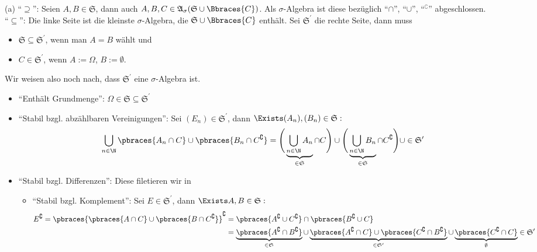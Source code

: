 \begin{solution}

(a) \enquote{$\supseteq$}: Seien $A, B \in \mathfrak{S}$, dann auch $A, B, C \in \mathfrak{A}_\sigma(\mathfrak{S} \cup \Bbraces{C})$. Als $\sigma$-Algebra ist diese bezüglich \enquote{$\cap$}, \enquote{$\cup$}, \enquote{$^\complement$} abgeschlossen. \\

\enquote{$\subseteq$}: Die linke Seite ist die kleinste $\sigma$-Algebra, die $\mathfrak{S} \cup \Bbraces{C}$ enthält. Sei $\mathfrak{S}^\prime$ die rechte Seite, dann muss

\begin{itemize}
  \item $\mathfrak{S} \subseteq \mathfrak{S}^\prime$, wenn man $A = B$ wählt und
  \item $C \in \mathfrak{S}^\prime$, wenn $A := \Omega$, $B := \emptyset$.
\end{itemize}

Wir weisen also noch nach, dass $\mathfrak{S}^\prime$ eine $\sigma$-Algebra ist.

\begin{itemize}

  \item \enquote{Enthält Grundmenge}: $\Omega \in \mathfrak{S} \subseteq \mathfrak{S}^\prime$

  \item \enquote{Stabil bzgl. abzählbaren Vereinigungen}: Sei $(E_n) \in \mathfrak{S}^\prime$, dann $\Exists (A_n), (B_n) \in \mathfrak{S}:$
  \begin{align*}
    \bigcup_{n \in \N} \pbraces{A_n \cap C} \cup \pbraces{B_n \cap C^\complement} =
    \Bigg ( \underbrace{\bigcup_{n \in \N} A_n}_{\in \mathfrak{S}} \cap C \Bigg ) \cup
    \Bigg ( \underbrace{\bigcup_{n \in \N} B_n}_{\in \mathfrak{S}} \cap C^\complement \Bigg ) \cup
    \in \mathfrak{S}^\prime
  \end{align*}

  \item \enquote{Stabil bzgl. Differenzen}: Diese filetieren wir in
  \begin{itemize}

    \item \enquote{Stabil bzgl. Komplement}: Sei $E \in \mathfrak{S}^\prime$, dann $\Exists A, B \in \mathfrak{S}:$
    \begin{align*}
      E^\complement
      = \pbraces{\pbraces{A \cap C} \cup \pbraces{B \cap C^\complement}}^\complement
      & = \pbraces{A^\complement \cup C^\complement} \cap \pbraces{B^\complement \cup C} \\
      & = \underbrace
          {
            \pbraces{A^\complement \cap B^\complement}
          }_{
            \in \mathfrak{S}
          } \cup
          \underbrace
          {
            \pbraces{A^\complement \cap C} \cup \pbraces{C^\complement \cap B^\complement}
          }_{
            \in \mathfrak{S}^\prime
          } \cup
          \underbrace
          {
            \pbraces{C^\complement \cap C}
          }_\emptyset
          \in \mathfrak{S}^\prime
    \end{align*}


\end{itemize}
\end{itemize}
\end{solution}
